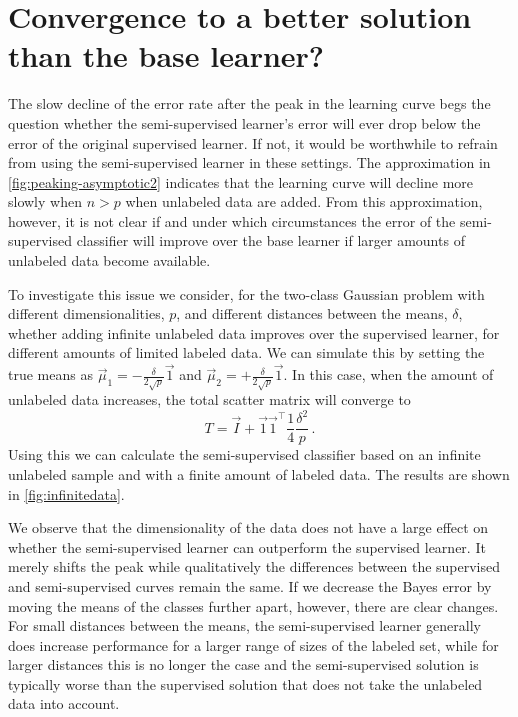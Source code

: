 \documentclass[runningheads,a4paper]{llncs}\usepackage[]{graphicx}\usepackage[]{color}
\begin{document}
\section{Convergence to a better solution than the base learner?} \label{section:decline}

The slow decline of the error rate after the peak in the learning curve begs the question whether the semi-supervised learner's error will ever drop below the error of the original supervised learner. If not, it would be worthwhile to refrain from using the semi-supervised learner in these settings.  The approximation in \cref{fig:peaking-asymptotic2} indicates that the learning curve will decline more slowly when $n>p$ when unlabeled data are added. From this approximation, however, it is not clear if and under which circumstances the error of the semi-supervised classifier will improve over the base learner if larger amounts of unlabeled data become available.

To investigate this issue we consider, for the two-class Gaussian problem with different dimensionalities, $p$, and different distances between the means, $\delta$, whether adding infinite unlabeled data improves over the supervised learner, for different amounts of limited labeled data. We can simulate this by setting the true means as $\vec{\mu}_1=-\tfrac{\delta}{2 \sqrt{p}}\vec{1}$ and $\vec{\mu}_2=+\tfrac{\delta}{2 \sqrt{p}}\vec{1}$. In this case, when the amount of unlabeled data increases, the total scatter matrix will converge to
$$
T = \vec{I} + \vec{1} \vec{1}^\top \frac{1}{4} \frac{\delta^2}{p} \,.
$$
Using this we can calculate the semi-supervised classifier based on an infinite unlabeled sample and with a finite amount of labeled data. The results are shown in \cref{fig:infinitedata}.

We observe that the dimensionality of the data does not have a large effect on whether the semi-supervised learner can outperform the supervised learner. It merely shifts the peak while qualitatively the differences between the supervised and semi-supervised curves remain the same. If we decrease the Bayes error by moving the means of the classes further apart, however, there are clear changes. For small distances between the means, the semi-supervised learner generally does increase performance for a larger range of sizes of the labeled set, while for larger distances this is no longer the case and the semi-supervised solution is typically worse than the supervised solution that does not take the unlabeled data into account.
\end{document}
